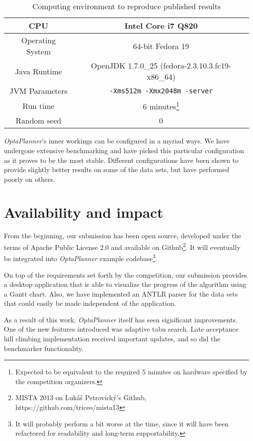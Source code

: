 \documentclass[10pt,a4paper]{article}
\begin{document}
\begin{table}
\caption{Computing environment to reproduce published results}
\centering
\begin{tabular}{c|c}
CPU & Intel Core i7 Q820\\ 
\hline 
Operating System & 64-bit Fedora 19\\ 
\hline 
Java Runtime & OpenJDK 1.7.0\_25 (fedora-2.3.10.3.fc19-x86\_64)\\ 
\hline 
JVM Parameters & \texttt{-Xms512m -Xmx2048m -server}\\ 
\hline 
Run time & 6 minutes\footnote{Expected to be equivalent to the required 5 minutes on hardware specified by the competition organizers.}\\ 
\hline 
Random seed & 0 
\end{tabular} 
\label{table:env}
\end{table}

\textit{OptaPlanner}'s inner workings can be configured in a myriad ways. We have undergone extensive benchmarking and have picked this particular configuration as it proves to be the most stable. Different configurations have been shown to provide slightly better results on some of the data sets, but have performed poorly on others.

\section{Availability and impact}

From the beginning, our submission has been open source, developed under the terms of Apache Public License 2.0 and available on Github\footnote{MISTA 2013 on Lukáš Petrovický's Github, https://github.com/triceo/mista13}. It will eventually be integrated into \textit{OptaPlanner} example codebase\footnote{It will probably perform a bit worse at the time, since it will have been refactored for readability and long-term supportability.}.

On top of the requirements set forth by the competition, our submission provides a desktop application that is able to visualize the progress of the algorithm using a Gantt chart. Also, we have implemented an ANTLR parser for the data sets that could easily be made independent of the application.

As a result of this work, \textit{OptaPlanner} itself has seen significant improvements. One of the new features introduced was adaptive tabu search. Late acceptance hill climbing implementation received important updates, and so did the benchmarker functionality.
\end{document}
